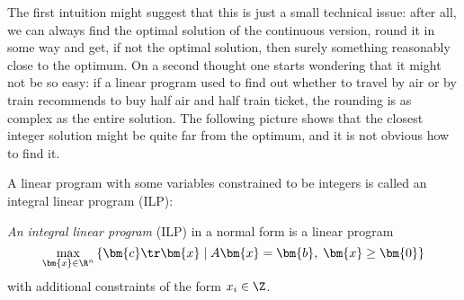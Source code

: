 \noindent 
The first intuition might suggest that this is just a small technical issue: after all, we can always find the 
optimal solution of the continuous version, round it in some way and get, if not the optimal solution, then 
surely something reasonably close to the optimum. On a second thought one starts wondering that it might not be
so easy: if a linear program  used to find out whether to travel by air or by train
recommends to buy half air and half train ticket, the rounding is as complex as the entire solution. The following 
picture shows that the closest integer solution might be quite far from the optimum, and it is not obvious how to
find it. 

\begin{center}
\end{center}

\noindent 
A linear program with some variables constrained to be integers is called an integral linear program (ILP):


\begin{framed}
  \begin{dfn}
    {\em An integral  linear program} (ILP) in a normal form is a linear program 
    $$ \max_{\bm{x}\in\R^n}\left\{ \bm{c}\tr\bm{x} \mid A\bm{x}=\bm{b},\;\bm{x}\ge\bm{0}\right\}$$
    with additional constraints of the form $x_i\in\Z$.
  \end{dfn}
\end{framed}

